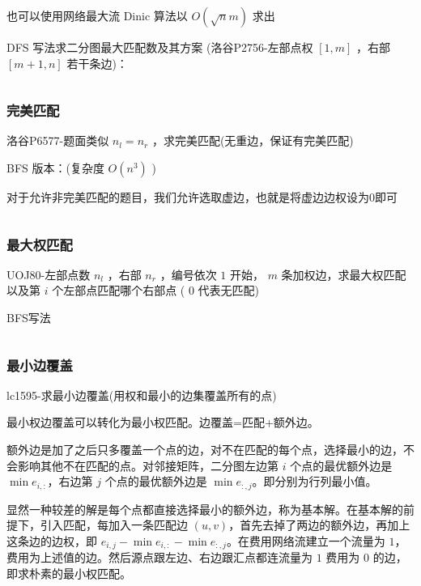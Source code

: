 \documentclass[twocolumn,10pt]{ctexart}
\begin{document}
也可以使用网络最大流 Dinic 算法以 $O(\sqrt n m)$ 求出

DFS 写法求二分图最大匹配数及其方案 (洛谷P2756-左部点权 $[1,m]$ ，右部 $[m+1,n]$ 若干条边)：

\inputminted{cpp}{code/p2756_hungarian.cpp}

\subsubsection{完美匹配}

\begin{notebox}
洛谷P6577-题面类似 $n_l=n_r$ ，求完美匹配(无重边，保证有完美匹配)
\end{notebox}

BFS 版本：(复杂度 $O(n^3)$ )

对于允许非完美匹配的题目，我们允许选取虚边，也就是将虚边边权设为0即可

\inputminted{cpp}{code/ext_047.cpp}

\subsubsection{最大权匹配}

\begin{notebox}
UOJ80-左部点数 $n_l$ ，右部 $n_r$ ，编号依次 $1$ 开始， $m$ 条加权边，求最大权匹配以及第 $i$ 个左部点匹配哪个右部点 ( $0$ 代表无匹配)
\end{notebox}

BFS写法

\inputminted{cpp}{code/uoj80_hungarian.cpp}

\subsubsection{最小边覆盖}

\begin{notebox}
lc1595-求最小边覆盖(用权和最小的边集覆盖所有的点)
\end{notebox}

最小权边覆盖可以转化为最小权匹配。边覆盖=匹配+额外边。

额外边是加了之后只多覆盖一个点的边，对不在匹配的每个点，选择最小的边，不会影响其他不在匹配的点。对邻接矩阵，二分图左边第 $i$ 个点的最优额外边是 $\min e_{i,:}$，右边第 $j$ 个点的最优额外边是 $\min e_{:,j}$。即分别为行列最小值。

显然一种较差的解是每个点都直接选择最小的额外边，称为基本解。在基本解的前提下，引入匹配，每加入一条匹配边 $(u,v)$，首先去掉了两边的额外边，再加上这条边的边权，即 $e_{i,\allowbreak{}j}-\min e_{i,\allowbreak{}:}-\min e_{:,\allowbreak{}j}$。在费用网络流建立一个流量为 $1$，费用为上述值的边。然后源点跟左边、右边跟汇点都连流量为 $1$ 费用为 $0$ 的边，即求朴素的最小权匹配。
\end{document}
